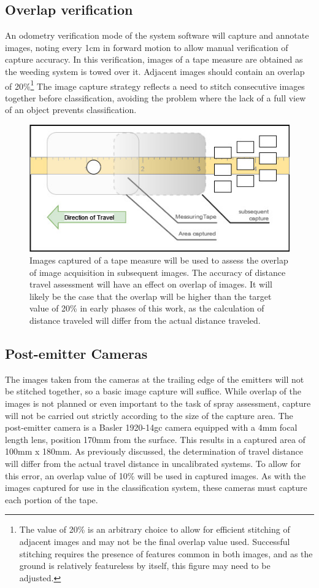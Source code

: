 \documentclass[12pt]{article}
\begin{document}
\subsection{Overlap verification}
An odometry verification mode of the system software will capture and annotate images, noting every 1cm in forward motion to allow manual verification of capture accuracy.  In this verification, images of a tape measure are obtained as the weeding system is towed over it. Adjacent images should contain an overlap of 20\%\footnote{The value of 20\% is an arbitrary choice to allow for efficient stitching of adjacent images and may not be the final overlap value used. Successful stitching requires the presence of features common in both images, and as the ground is relatively featureless by itself, this figure may need to be adjusted.} The image capture strategy reflects a need to stitch consecutive images together before classification, avoiding the problem where the lack of a full view of an object prevents classification.
\begin{figure}[H]
	\centering
	\includegraphics[width=0.75\linewidth]{./figures/test-distance.jpg}
	\caption[Test for distance measurement from emitter]{Images captured of a tape measure will be used to assess the overlap of image acquisition in  subsequent images. The accuracy of distance travel assessment will have an effect on overlap of images. It will likely be the case that the overlap will be higher than the target value of 20\% in early phases of this work, as the calculation of distance traveled will differ from the actual distance traveled.}
	\label{fig:test-distance}
\end{figure}

\subsection{Post-emitter Cameras}
The images taken from the cameras at the trailing edge of the emitters will not be stitched together, so a basic image capture will suffice. While overlap of the images is not planned or even important to the task of spray assessment, capture will not be carried out strictly according to the size of the capture area. The post-emitter camera is a Basler 1920-14gc camera equipped with a 4mm focal length lens, position 170mm from the surface. This results in a captured area of 100mm x 180mm. As previously discussed, the determination of travel distance will differ from the actual travel distance in uncalibrated systems. To allow for this error, an overlap value of 10\% will be used in captured images. As with the images captured for use in the classification system, these cameras must capture each portion of the tape.
\end{document}
